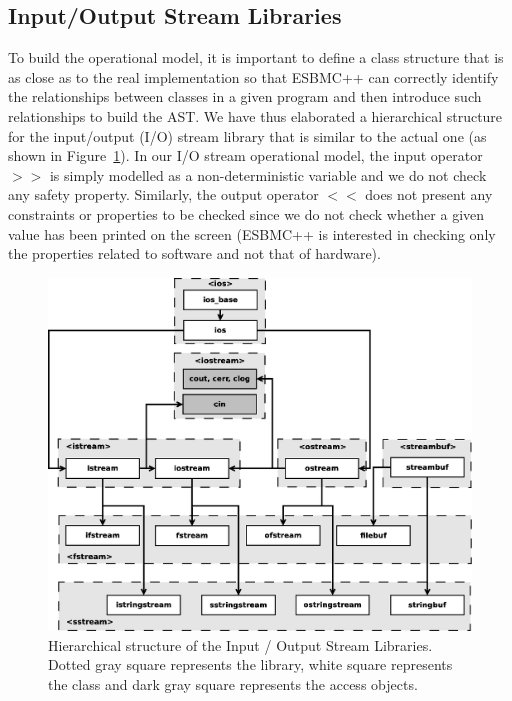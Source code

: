 \documentclass[a4paper]{llncs}
\begin{document}
\subsection{Input/Output Stream Libraries}

To build the operational model, it is important
to define a class structure that is as close as to the
real implementation so that ESBMC++ can correctly identify
the relationships between classes in a given program and
then introduce such relationships to build the AST.
We have thus elaborated a hierarchical structure for the
input/output (I/O) stream library that is similar to the actual
one (as shown in Figure~\ref{figure:cpp-inputoutputdiagram}).
In our I/O stream operational model, the input operator $>>$
is simply modelled as a non-deterministic variable and we do not check
any safety property. Similarly, the output operator $<<$ does not
present any constraints or properties to be checked since
we do not check whether a given value has been printed on the screen
(ESBMC++ is interested in checking only the properties related to
software and not that of hardware).


\begin{figure}[ht]
\centering
\includegraphics[scale=0.24]{figures/inputoutputdiagram}
\caption{Hierarchical structure of the Input / Output Stream Libraries.
Dotted gray square represents the library, white square represents the class and dark gray square represents the access objects.}
\label{figure:cpp-inputoutputdiagram}
\end{figure}
\end{document}
